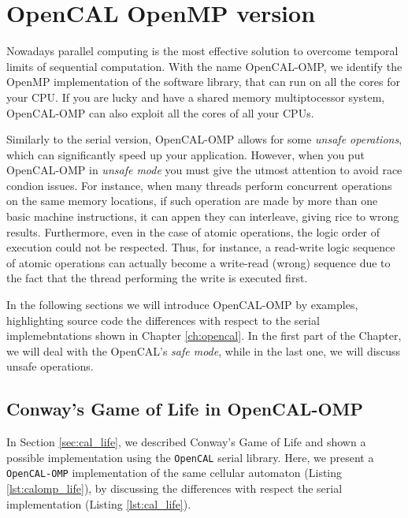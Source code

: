 \chapter{OpenCAL OpenMP version}\label{ch:opencal-omp}

Nowadays parallel computing is the most effective solution to overcome temporal limits of sequential computation. 
With the name OpenCAL-OMP, we identify the OpenMP implementation of
the software library, that can run on all the cores for your CPU. If
you are lucky and have a shared memory multiptocessor system,
OpenCAL-OMP can also exploit all the cores of all your CPUs.

Similarly to the serial version, OpenCAL-OMP allows for some
\emph{unsafe operations}, which can significantly speed up your
application. However, when you put OpenCAL-OMP in \emph{unsafe mode}
you must give the utmost attention to avoid race condion issues. For
instance, when many threads perform concurrent operations on the same
memory locations, if such operation are made by more than one basic
machine instructions, it can appen they can interleave, giving rice to
wrong results. Furthermore, even in the case of atomic operations, the
logic order of execution could not be respected. Thus, for instance, a
read-write logic sequence of atomic operations can actually become a
write-read (wrong) sequence due to the fact that the thread performing
the write is executed first.

In the following sections we will introduce OpenCAL-OMP by examples,
highlighting source code the differences with respect to the serial
implemebntations shown in Chapter \ref{ch:opencal}. In the first part of
the Chapter, we will deal with the OpenCAL's \emph{safe mode}, while in
the last one, we will discuss unsafe operations.

\section{Conway's Game of Life in OpenCAL-OMP}

In Section \ref{sec:cal_life}, we described Conway's Game of Life and
shown a possible implementation using the \verb'OpenCAL' serial
library. Here, we present a \verb'OpenCAL-OMP' implementation of the
same cellular automaton (Listing \ref{lst:calomp_life}), by discussing
the differences with respect the serial implementation (Listing
\ref{lst:cal_life}).



